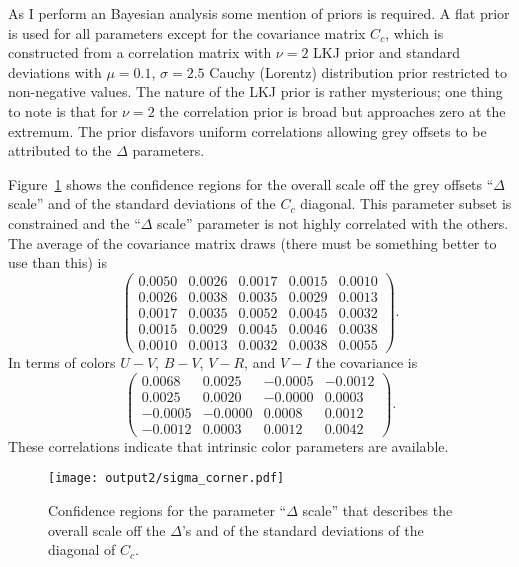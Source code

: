 \documentclass[11pt, oneside]{article}   	%
\begin{document}
As I perform an Bayesian analysis some mention of priors is required.  A flat prior is used for all parameters except
for the covariance matrix $C_c$, which is constructed from a correlation matrix with  $\nu=2$  LKJ prior and standard
deviations with
 $\mu=0.1$, $\sigma=2.5$ Cauchy (Lorentz) distribution prior restricted to non-negative values.
The nature of the LKJ prior is rather mysterious; one thing to note is that for $\nu=2$ the correlation prior is broad but
approaches zero at the extremum.  The prior disfavors uniform correlations allowing grey offsets to be attributed to the $\Delta$ parameters.

Figure~\ref{sigma:fig} shows the confidence regions for 
 the overall scale off the grey offsets
 ``$\Delta$ scale''
and of the standard deviations of the $C_c$ diagonal.  This parameter subset is constrained and the  ``$\Delta$ scale'' parameter
is not highly correlated with the others.  The average
of the covariance matrix draws (there must be something better to use than this) is 
\begin{equation}
\begin{pmatrix}
0.0050 & 0.0026 & 0.0017 & 0.0015 & 0.0010 \\
0.0026 & 0.0038 & 0.0035 & 0.0029 & 0.0013 \\
0.0017 & 0.0035 & 0.0052 & 0.0045 & 0.0032 \\
0.0015 & 0.0029 & 0.0045 & 0.0046 & 0.0038 \\
0.0010 & 0.0013 & 0.0032 & 0.0038 & 0.0055
 \end{pmatrix}.
 \end{equation}
 In terms of colors $U-V$, $B-V$, $V-R$, and $V-I$ the covariance is
\begin{equation}
\begin{pmatrix}
 0.0068 & 0.0025 & -0.0005 & -0.0012 \\
0.0025 & 0.0020 & -0.0000 & 0.0003 \\
-0.0005 & -0.0000 & 0.0008 & 0.0012 \\
-0.0012 & 0.0003 & 0.0012 & 0.0042
  \end{pmatrix}.
 \end{equation}
These correlations indicate that intrinsic color parameters are available. 
  
\begin{figure}[htbp] %
   \centering
   \texttt{[image: output2/sigma\_corner.pdf]} 
   \caption{Confidence regions for the parameter ``$\Delta$ scale'' that describes the overall scale off the $\Delta$'s
and of the standard deviations of the diagonal of $C_c$.}
   \label{sigma:fig}
\end{figure}
\end{document}
